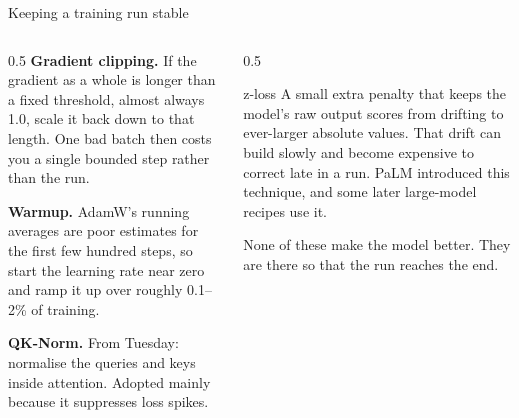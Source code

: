 \documentclass[aspectratio=169,10pt]{beamer}
\begin{document}
\begin{frame}{Keeping a training run stable}
  \begin{columns}[T]
    \begin{column}{0.5\textwidth}
      \textbf{Gradient clipping.} If the gradient as a whole is longer than a
      fixed threshold, almost always 1.0, scale it back down to that length.
      One bad batch then costs you a single bounded step rather than the run.
      \vspace{0.5em}

      \textbf{Warmup.} AdamW's running averages are poor estimates for the first
      few hundred steps, so start the learning rate near zero and ramp it up
      over roughly 0.1--2\% of training.
      \vspace{0.5em}

      \textbf{QK-Norm.} From Tuesday: normalise the queries and keys inside
      attention. Adopted mainly because it suppresses loss spikes.
    \end{column}
    \begin{column}{0.5\textwidth}
      \begin{block}{z-loss}
        \small
        A small extra penalty that keeps the model's raw output scores from
        drifting to ever-larger absolute values.
        \vspace{0.3em}
        That drift can build slowly and become expensive to correct late in a
        run. PaLM introduced this technique, and some later large-model recipes
        use it.
      \end{block}
      \vspace{0.3em}
      \small
      None of these make the model better. They are there so that the run
      reaches the end.
    \end{column}
  \end{columns}
\end{frame}
\end{document}
